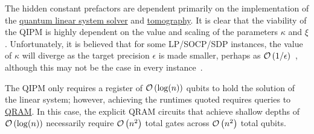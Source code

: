 \begin{refsection}
The hidden constant prefactors are dependent primarily on the implementation of the \hyperref[prim:QuantumLinearSystemSolvers]{quantum linear system solver} and \hyperref[prim:Tomography]{tomography}. It is clear that the viability of the QIPM is highly dependent on the value and scaling of the parameters $\kappa$ and $\xi$. Unfortunately, it is believed that for some LP/SOCP/SDP instances, the value of $\kappa$ will diverge as the target precision $\epsilon$ is made smaller, perhaps as $\mathcal{O}\left( 1/\epsilon \right)$~\cite{kerenidis2019QAlgsSecondOrderConeSVM,augustino2021quantum}, although this may not be the case in every instance~\cite{huang2022fasterQuantumIPM}. 

The QIPM only requires a register of $\mathcal{O}\left( \log(n) \right)$ qubits to hold the solution of the linear system; however, achieving the runtimes quoted requires queries to \hyperref[prim:QRAM]{QRAM}. In this case, the explicit QRAM circuits that achieve shallow depths of $\mathcal{O}\left( \log(n) \right)$ necessarily require $\mathcal{O}\left( n^2 \right)$ total gates across $\mathcal{O}\left( n^2 \right)$ total qubits. 



\end{refsection}

